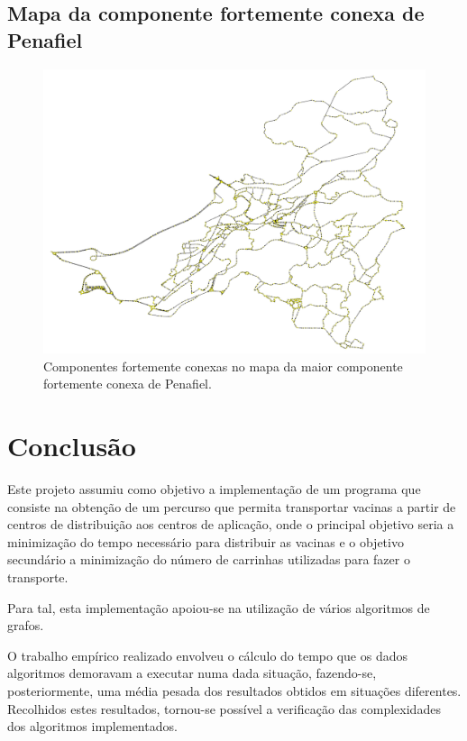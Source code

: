 \documentclass[12pt,a4paper]{report}
\begin{document}
\section{Mapa da componente fortemente conexa de Penafiel}

\begin{figure}[H]
	\includegraphics[width=1.0\textwidth]{./imgs/scc/penafielStrongSCC.png}
	\centering
	\caption{Componentes fortemente conexas no mapa da maior componente fortemente conexa de Penafiel.}
\end{figure}



\chapter{Conclusão}

\par Este projeto assumiu como objetivo a implementação de um programa que consiste na obtenção de um percurso que permita transportar
vacinas a partir de centros de distribuição aos centros de aplicação, onde o principal objetivo seria a minimização do tempo 
necessário para distribuir as vacinas e o objetivo secundário a minimização do número de carrinhas utilizadas para fazer o transporte. \par

Para tal, esta implementação apoiou-se na utilização de vários algoritmos de grafos. \par

O trabalho empírico realizado envolveu o cálculo do tempo que os dados algoritmos demoravam a executar numa dada situação, fazendo-se, 
posteriormente, uma média pesada dos resultados obtidos em situações diferentes. Recolhidos estes resultados, tornou-se possível a 
verificação das complexidades dos algoritmos implementados.
\end{document}
